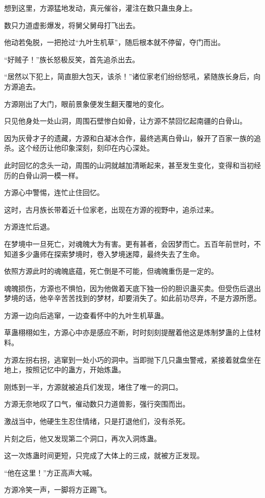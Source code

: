 \begin{this_body}
想到这里，方源猛地发动，真元催谷，灌注在数只蛊虫身上。

数只力道虚影爆发，将舅父舅母打飞出去。

他动若兔脱，一把抢过“九叶生机草”，随后根本就不停留，夺门而出。

“好贼子！”族长怒极反笑，首先追杀出去。

“居然以下犯上，简直胆大包天，该杀！”诸位家老们纷纷怒吼，紧随族长身后，向方源追去。

方源刚出了大门，眼前景象便发生翻天覆地的变化。

只见他身处一处山洞，周围石壁惨白如骨，让方源不禁回忆起南疆的白骨山。

因为灰骨才子的遗藏，方源和白凝冰合作，最终逃离白骨山，躲开了百家一族的追杀。这个经历让他印象深刻，刻印在内心深处。

此时回忆的念头一动，周围的山洞就越加清晰起来，甚至发生变化，变得和当初经历的白骨山洞一模一样。

方源心中警惕，连忙止住回忆。

这时，古月族长带着近十位家老，出现在方源的视野中，追杀过来。

方源连忙后退。

在梦境中一旦死亡，对魂魄大为有害。更有甚者，会因梦而亡。五百年前世时，不知道多少蛊师在探索梦境时，卷入梦境迷障，最终失去了生命。

依照方源此时的魂魄底蕴，死亡倒是不可能，但魂魄重伤是一定的。

魂魄损伤，方源也不惧怕，因为他做着天底下独一份的胆识蛊买卖。但受伤后退出梦境的话，他辛辛苦苦找到的梦材，却要消失了。如此前功尽弃，不是方源所愿。

方源一边向后逃窜，一边查看怀中的九叶生机草蛊。

草蛊栩栩如生，方源心中亦是感应不断，时时刻刻提醒着他这是炼制梦蛊的上佳材料。

方源左拐右拐，逃窜到一处小巧的洞中。当即抛下几只蛊虫警戒，紧接着就盘坐在地上，按照记忆中的蛊方，开始炼蛊。

刚炼到一半，方源就被追兵们发现，堵住了唯一的洞口。

方源无奈地叹了口气，催动数只力道兽影，强行突围而出。

激战当中，他硬生生忍住情绪，只是打退他们，没有杀死。

片刻之后，他又发现第二个洞口，再次入洞炼蛊。

这一次炼蛊时间更短，只完成了大体上的三成，就被方正发现。

“他在这里！”方正高声大喊。

方源冷笑一声，一脚将方正踢飞。


\end{this_body}
